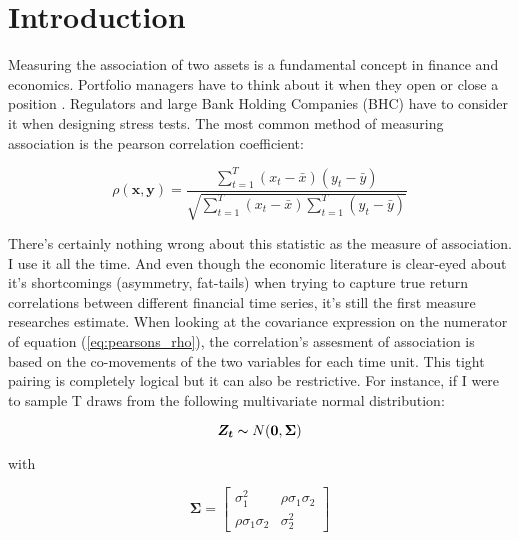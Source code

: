 \documentclass[12pt]{article}
\begin{document}
\section{Introduction}

Measuring the association of two assets is a fundamental concept in finance and economics. Portfolio managers have to think about it when they open or close a position \cite{Markowitz1952PortfolioSelection,sharpe1963simplified}. Regulators and large Bank Holding Companies (BHC) have to consider it when designing stress tests. The most common method of measuring association is the pearson correlation coefficient:

\begin{equation} \label{eq:pearsons_rho}
\rho(\boldsymbol{x}, \boldsymbol{y}) = \frac{ \sum_{t=1}^{T} (x_{t} - \bar{x}) (y_{t} - \bar{y})}{ \sqrt{\sum_{t=1}^{T} (x_{t} - \bar{x}) \sum_{t=1}^{T} (y_{t} - \bar{y})}}
\end{equation}

There's certainly nothing wrong about this statistic as the measure of association. I use it all the time. And even though the economic literature is clear-eyed about it's shortcomings (asymmetry, fat-tails) when trying to capture true return correlations between different financial time series, it's still the first measure researches estimate. When looking at the covariance expression on the numerator of equation (\ref{eq:pearsons_rho}), the correlation's assesment of association is based on the co-movements of the two variables for each time unit. This tight pairing is completely logical but it can also be restrictive. For instance, if I were to sample T draws from the following multivariate normal distribution:

\begin{equation}
    \boldsymbol{Z_{t}} \thicksim N(\boldsymbol{0}, \boldsymbol{\Sigma})
\end{equation}

with 

\begin{equation}
    \boldsymbol{\Sigma} = \begin{bmatrix}
        \sigma_{1}^{2}             & \rho \sigma_{1}\sigma_{2} \\
        \rho \sigma_{1} \sigma_{2} & \sigma_{2}^{2} 
    \end{bmatrix}
\end{equation}
\end{document}

